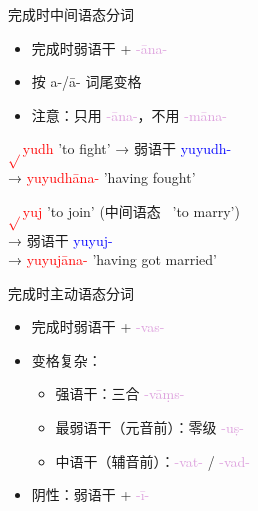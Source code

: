 \documentclass[17pt]{beamer}
\newenvironment{indentlist}
  {\begin{list}{}{\setlength{\leftmargin}{2em}\setlength{\itemsep}{0.5em}}}
  {\end{list}}
\newcommand{\verbroot}[1]{\textcolor{red}{$\sqrt{}$#1}}
\newcommand{\nounstem}[1]{\textcolor{red}{#1\nobreakdash-}}
\newcommand{\verbstem}[1]{\textcolor{blue}{#1\nobreakdash-}}
\newcommand{\pratyaya}[1]{\mbox{\textcolor{Plum}{#1}}}
\begin{document}
\begin{frame}{完成时中间语态分词}
  \small
  \begin{itemize}
    \item 完成时弱语干 + \pratyaya{-āna-}
    \item 按 \mbox{a-/ā-} 词尾变格
    \item 注意：只用 \pratyaya{-āna-}，不用 \pratyaya{-māna-}
  \end{itemize}

  \begin{indentlist}
    \item \verbroot{yudh} 'to fight' → 弱语干 \verbstem{yuyudh}\\
      → \nounstem{yuyudhāna} 'having fought'
    \item \verbroot{yuj} 'to join' (中间语态~ 'to marry')\\
      → 弱语干 \verbstem{yuyuj}\\
      → \nounstem{yuyujāna} 'having got married'
  \end{indentlist}
\end{frame}

\begin{frame}{完成时主动语态分词}
  \small
  \begin{itemize}
    \item 完成时弱语干 + \pratyaya{-vas-}
    \item 变格复杂：
    \begin{itemize}
      \item 强语干：三合 \pratyaya{-vāṃs-}\\
      \item 最弱语干（元音前）：零级 \pratyaya{-uṣ-}\\
      \item 中语干（辅音前）：\pratyaya{-vat-} / \pratyaya{-vad-}
    \end{itemize}
    \item 阴性：弱语干 + \pratyaya{-ī-}
  \end{itemize}
\end{frame}
\end{document}
